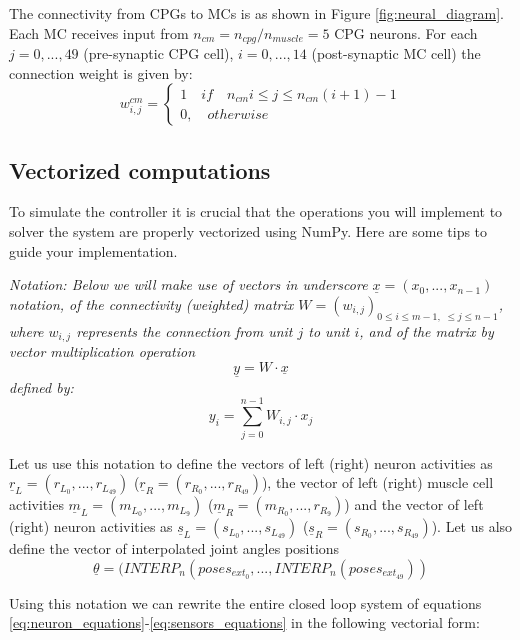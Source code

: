 \documentclass{cmc}
\begin{document}
The connectivity from CPGs to MCs is as shown in Figure \ref{fig:neural_diagram}. Each MC receives input from $n_{cm}=n_{cpg}/n_{muscle}=5$ CPG neurons. For each $j=0,...,49$ (pre-synaptic CPG cell), $i=0,...,14$ (post-synaptic MC cell) the connection weight is given by:
\begin{equation}
    w^{cm}_{i,j} = \begin{cases}
      1 \quad if \quad n_{cm} i \leq j \leq n_{cm} (i+1)-1\\
      0, \quad otherwise
    \end{cases}
\end{equation}

\subsection*{Vectorized computations}
To simulate the controller it is crucial that the operations you will implement to solver the system are properly vectorized using NumPy. Here are some tips to guide your implementation.

\textit{Notation:
Below we will make use of vectors in underscore $\underline{x}=(x_0,...,x_{n-1})$ notation, of the connectivity (weighted) matrix $W=(w_{i,j})_{0\leq i \leq m-1, \; \leq j \leq n-1}$, where $w_{i,j}$ represents the connection from unit $j$ to unit $i$, and of the matrix by vector multiplication operation
$$ \underline{y} = W \cdot \underline{x} $$
defined by:
$$ y_i = \sum_{j=0}^{n-1} W_{i,j} \cdot x_j $$
}

Let us use this notation to define the vectors of left (right) neuron activities as $\underline{r}_L=(r_{L_0},...,r_{L_{49}})$ ($\underline{r}_R=(r_{R_0},...,r_{R_{49}})$), the vector of left (right) muscle cell activities $\underline{m}_L=(m_{L_0},...,m_{L_9})$ ($\underline{m}_R=(m_{R_0},...,r_{R_9})$) and the vector of left (right) neuron activities as $\underline{s}_L=(s_{L_0},...,s_{L_{49}})$ ($\underline{s}_R=(s_{R_0},...,s_{R_{49}})$). Let us also define the vector of interpolated joint angles positions
$$\underline{\theta} = (INTERP_n(poses_{ext_0},...,INTERP_n(poses_{ext_{49}}))$$

Using this notation we can rewrite the entire closed loop system of equations \ref{eq:neuron_equations}-\ref{eq:sensors_equations} in the following vectorial form:
\end{document}
